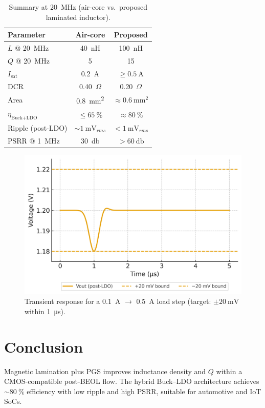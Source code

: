 \documentclass[journal]{IEEEtran}
\begin{document}
\begin{table}[t]
\caption{Summary at \SI{20}{\mega\hertz} (air-core vs.\ proposed laminated inductor).}
\label{tab:summary}
\centering
\begin{tabular}{lcc}
\toprule
Parameter & Air-core & Proposed \\
\midrule
$L$ @ \SI{20}{\mega\hertz} & \SI{40}{\nano\henry} & \SI{100}{\nano\henry} \\
$Q$ @ \SI{20}{\mega\hertz} & 5 & 15 \\
$I_{\text{sat}}$ & \SI{0.2}{\ampere} & $\ge\SI{0.5}{\ampere}$ \\
DCR & 0.40~\(\Omega\) & 0.20~\(\Omega\) \\
Area & \SI{0.8}{\milli\meter\squared} & $\approx\SI{0.6}{\milli\meter\squared}$ \\
$\eta_{\text{Buck+LDO}}$ & $\le\SI{65}{\percent}$ & $\approx\SI{80}{\percent}$ \\
Ripple (post-LDO) & $\sim\SI{1}{\milli\volt_{rms}}$ & $<\SI{1}{\milli\volt_{rms}}$ \\
PSRR @ \SI{1}{\mega\hertz} & \SI{30}{\decibel} & $>\SI{60}{\decibel}$ \\
\bottomrule
\end{tabular}
\end{table}

\begin{figure}[t]
  \centering
  \includegraphics[width=.95\linewidth]{fig/fig5_transient_response.png}
  \caption{Transient response for a \SI{0.1}{\ampere} $\rightarrow$ \SI{0.5}{\ampere} load step (target: $\pm\SI{20}{\milli\volt}$ within \SI{1}{\micro\second}).}
  \label{fig:transient}
\end{figure}

\section{Conclusion}
Magnetic lamination plus PGS improves inductance density and $Q$ within a CMOS-compatible post-BEOL flow. The hybrid Buck--LDO architecture achieves $\sim\SI{80}{\percent}$ efficiency with low ripple and high PSRR, suitable for automotive and IoT SoCs.
\end{document}
